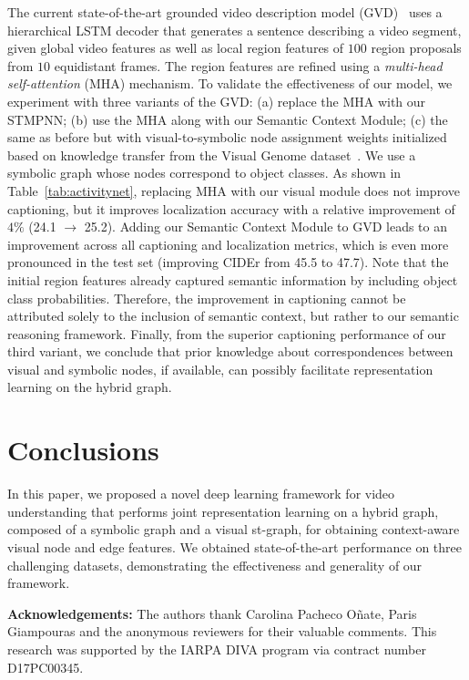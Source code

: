 \documentclass[runningheads]{llncs}
\begin{document}
The current state-of-the-art grounded video description model (GVD)~\cite{Zhou:CVPR19} uses a hierarchical LSTM decoder that generates a sentence describing a video segment, given global video features as well as local region features of $100$ region proposals from $10$ equidistant frames. The region features are refined using a \emph{multi-head self-attention} (MHA) mechanism. To validate the effectiveness of our model, we experiment with three variants of the GVD: (a) replace the MHA with our \ac{STMPNN}; (b) use the MHA along with our Semantic Context Module; (c) the same as before but with visual-to-symbolic node assignment weights initialized based on knowledge transfer from the Visual Genome dataset~\cite{Krishna:IJCV17}. We use a symbolic graph whose nodes correspond to object classes. As shown in Table~\ref{tab:activitynet}, replacing MHA with our visual module does not improve captioning, but it improves localization accuracy with a relative improvement of $4\%$ (24.1 $\rightarrow$ 25.2). Adding our Semantic Context Module to GVD leads to an improvement across all captioning and localization metrics, which is even more pronounced in the test set (improving CIDEr from 45.5 to 47.7). Note that the initial region features already captured semantic information by including object class probabilities. Therefore, the improvement in captioning cannot be attributed solely to the inclusion of semantic context, but rather to our semantic reasoning framework. Finally, from the superior captioning performance of our third variant, we conclude that prior knowledge about correspondences between visual and symbolic nodes, if available, can possibly facilitate representation learning on the hybrid graph. \section{Conclusions}
\label{sec:conclusions}
In this paper, we proposed a novel deep learning framework for video understanding that performs joint representation learning on a hybrid graph, composed of a symbolic graph and a visual st-graph, for obtaining context-aware visual node and edge features.  We obtained state-of-the-art performance on three challenging datasets, demonstrating the effectiveness and generality of our framework. 

 

\smallskip\noindent\textbf{Acknowledgements:}
The authors thank Carolina Pacheco O\~nate, Paris Giampouras 
and the anonymous reviewers for their valuable comments. This research was 
supported by the IARPA DIVA program via contract number D17PC00345.
 

\end{document}
